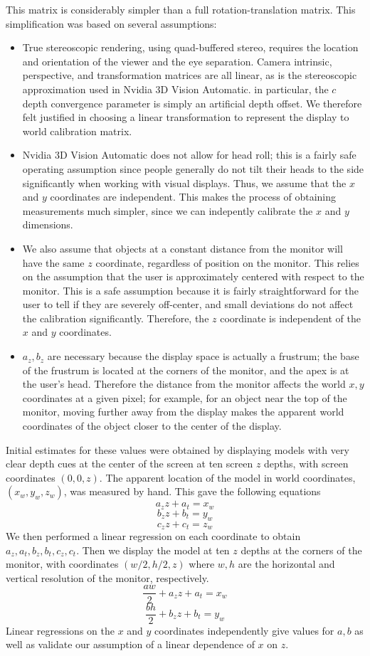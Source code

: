 \documentclass[pageno]{jpaper}
\begin{document}
This matrix is considerably simpler than a full rotation-translation matrix. This simplification was based on several assumptions:
\begin{itemize}
\item True stereoscopic rendering, using quad-buffered stereo, requires the location and orientation of the viewer and the eye separation.
Camera intrinsic, perspective, and transformation matrices are all linear, as is the stereoscopic approximation used in Nvidia 3D Vision
Automatic. in particular, the $c$ depth convergence parameter is simply an artificial depth offset. We therefore felt justified in choosing
a linear transformation to represent the display to world calibration matrix.
\item Nvidia 3D Vision Automatic does not allow for head roll; this is a fairly safe operating assumption since people generally do 
not tilt their heads to the side significantly when working with visual displays. Thus, we assume that the $x$ and $y$ coordinates are
independent. This makes the process of obtaining measurements much simpler, since we can indepently calibrate the $x$ and $y$ dimensions.
\item We also assume that objects at a constant distance from the monitor will have the same $z$ coordinate, regardless
of position on the monitor. This relies on the assumption that the user is approximately centered with respect to the monitor. This is
a safe assumption because it is fairly straightforward for the user to tell if they are severely off-center, and small deviations
do not affect the calibration significantly. Therefore, the $z$ coordinate is independent of the $x$ and $y$ coordinates.
\item $a_z, b_z$ are necessary because the display space is actually a frustrum; the base of the frustrum is located at the corners of
the monitor, and the apex is at the user's head. Therefore the distance from the monitor affects the world $x,y$ coordinates at a given
pixel; for example, for an object near the top of the monitor, moving further away from the display makes the apparent world coordinates of the
object closer to the center of the display.
\end{itemize}

Initial estimates for these values were obtained by displaying models with very clear depth cues at the center of the screen at ten screen $z$ depths,
with screen coordinates $(0,0,z)$. The apparent location of the model in world coordinates, $(x_w, y_w, z_w)$, was measured by hand. This gave the following equations
$$a_zz + a_t = x_w$$
$$b_zz + b_t = y_w$$
$$c_zz + c_t = z_w$$
We then performed a linear regression on each coordinate to obtain $a_z, a_t, b_z, b_t, c_z, c_t$. 
Then we display the model at ten $z$ depths at the corners of the monitor, with coordinates $(w/2, h/2, z)$ where $w,h$ are the horizontal and vertical
resolution of the monitor, respectively.
$$\frac{aw}{2} + a_zz + a_t = x_w$$
$$\frac{bh}{2} + b_zz + b_t = y_w$$
Linear regressions on the $x$ and $y$ coordinates independently give values for $a,b$ as well as validate our assumption of a linear dependence of $x$ on $z$.
\end{document}
